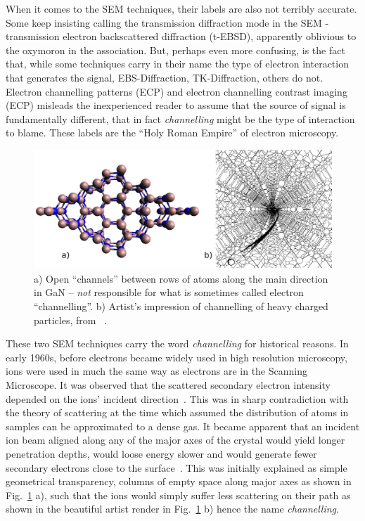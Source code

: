 When it comes to the SEM techniques, their labels are also not terribly accurate. Some keep insisting calling the transmission diffraction  mode in the SEM - transmission electron backscattered diffraction (t-EBSD), apparently oblivious to the oxymoron in the  association. But, perhaps even more confusing, is the fact that, while some techniques carry in their name the type of electron interaction that generates the signal, EBS-Diffraction, TK-Diffraction, others do not. Electron channelling patterns (ECP) and electron channelling contrast imaging (ECP) misleads the inexperienced reader to assume that the source of signal is fundamentally different, that in fact \textit{channelling} might be the type of interaction to blame. These labels are the ``Holy Roman Empire'' of electron microscopy. 

\begin{figure}[!h]
    \centering
\includegraphics[width=1\linewidth]{Figures/channel2.png}
\caption{ a) Open ``channels'' between rows of atoms along the main direction \hkl[001] in GaN -- \emph{not} responsible for what is sometimes called electron ``channelling''. b) Artist's impression of channelling of heavy charged particles, from~\cite{Brandt68} .}
\label{Fig:channels}
\end{figure}


These two SEM techniques carry the word \textit{channelling} for historical reasons. In early 1960s, before electrons became widely used in high resolution microscopy, ions were used in much the same way as electrons are in the Scanning Microscope. It was observed that the scattered secondary electron intensity depended on the ions' incident direction~\cite{Davies83}. This was in sharp contradiction with the 
theory of scattering at the time which assumed the distribution of atoms in samples can be approximated to a dense gas. It became apparent that an incident ion beam aligned along any of the major axes of the crystal would yield longer penetration depths, would loose energy slower and would generate fewer secondary electrons close to the surface~\cite{Piercy63}. This was initially explained as simple geometrical transparency, \ie columns of empty space along major axes as shown in Fig.~\ref{Fig:channels} a), such that the ions would simply suffer less scattering on their path as shown in the beautiful artist render in Fig.~\ref{Fig:channels} b) hence the name \textit{channelling}.


